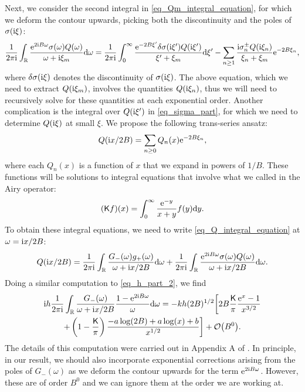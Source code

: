 \documentclass[a4paper,11pt]{article}
\theoremstyle{definition}
\newcommand{\re}{{\rm e}}
\newcommand{\ri}{{\rm i}}
\newcommand{\rd}{{\rm d}}
\begin{document}
Next, we consider the second integral in \eqref{eq_Qm_integral_equation}, for which we deform the contour upwards, picking both the discontinuity and the poles of $\sigma(\ri\xi)$:
\begin{equation}
\frac{1}{2 \pi \ri} \int_\mathbb{R} \frac{\re^{2 \ri B\omega} \sigma (\omega) Q(\omega)}{\omega+ \ri\xi_m} \rd \omega = \frac{1}{2\pi\ri} \int_0^\infty \frac{\re^{-2B\xi'}\delta\sigma(\ri\xi')Q(\ri\xi')}{\xi' + \xi_m} \rd\xi' - \sum_{n\ge 1} \frac{\ri\sigma^\pm_n Q(\ri\xi_n)}{\xi_n + \xi_m} \re^{-2B\xi_n},
\label{eq_sigma_part}
\end{equation}
where $\delta \sigma(\ri\xi)$ denotes the discontinuity of $\sigma(\ri\xi)$. The above equation, which we need to extract $Q(\ri\xi_m)$, involves the quantities $Q(\ri\xi_n)$, thus we will need to recursively solve for these quantities at each exponential order. Another complication is the integral over $Q(\ri\xi')$ in \eqref{eq_sigma_part}, for which we need to determine $Q(\ri\xi)$ at small $\xi$. We propose the following trans-series ansatz:
\begin{equation}
Q(\ri x /2B) = \sum_{n\ge 0} Q_{n} (x) \re^{-2B\xi_n},
\end{equation}
where each $Q_{n}(x)$ is a function of $x$ that we expand in powers of $1/B$. These functions will be 
solutions to integral equations that involve what we called in \cite{mmr-an} the Airy operator:
%
\begin{equation}
(\mathsf{K}f)(x) = \int_0^\infty \frac{\re^{-y}}{x+y} f(y)\mathrm{d}y.
\end{equation}
%
To obtain these integral equations, we need to write \eqref{eq_Q_integral_equation} at $\omega=\ri x/2B$:
\begin{equation}
Q(\ri x/2B)= \frac{1}{2 \pi \ri} \int_\mathbb{R} \frac{G_-(\omega) g_+(\omega)}{\omega+ \ri x/2B} \rd \omega + \frac{1}{2 \pi \ri} \int_\mathbb{R} \frac{\re^{2 \ri B\omega} \sigma (\omega) Q(\omega)}{\omega+ \ri x /2B} \rd \omega.
\label{eq_QB_integral_equation}
\end{equation}
Doing a similar computation to \eqref{eq_h_part_2}, we find
\begin{multline}
\ri h \frac{1}{2\pi\ri} \int_\mathbb{R} \frac{G_-(\omega)}{\omega + \ri x/2B} \frac{1-\re^{2\ri B\omega}}{\omega} \rd \omega = -kh(2B)^{1/2} \biggl[ 2B \frac{\mathsf{K}}{\pi}\frac{\re^x - 1}{x^{3/2}}\\
+ \left( 1 - \frac{\mathsf{K}}{\pi} \right) \frac{-a\log(2B) + a \log(x) + b}{x^{1/2}} \biggr]+ \mathcal{O}\big(B^0\big).
\end{multline}
The details of this computation were carried out in Appendix A of \cite{mmr-an}. In principle, in our result, we should also incorporate exponential corrections arising from the poles of $G_-(\omega)$ as we deform the contour upwards for the term $\re^{2\ri B \omega}$. However, these are of order $B^0$ and we can ignore them at the order we are working at.
\end{document}
